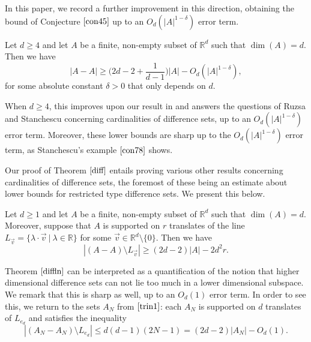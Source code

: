 In this paper, we record a further improvement in this direction, obtaining the bound of Conjecture $\ref{con45}$ up to an $O_{d}(|A|^{1- \delta})$ error term.

\begin{theorem} \label{diff}
Let $d \geq 4$ and let $A$ be a finite, non-empty subset of $\mathbb{R}^d$ such that $\dim(A) = d$. Then we have
\[ |A-A| \geq \bigg(2d - 2 + \frac{1}{d-1}\bigg) |A| - O_d(|A|^{1- \delta}), \]
for some absolute constant $\delta >0$ that only depends on $d$.
\end{theorem}

When $d \geq 4$, this improves upon our result in \cite{Ak2021} and answers the questions of Ruzsa \cite{Ru1994} and Stanchescu \cite{St2001} concerning cardinalities of difference sets, up to an $O_d(|A|^{1 - \delta})$ error term. Moreover, these lower bounds are sharp up to the $O_d(|A|^{1 - \delta})$ error term, as Stanchescu's example $\eqref{con78}$ shows. 

Our proof of Theorem $\ref{diff}$ entails proving various other results concerning cardinalities of difference sets, the foremost of these being an estimate about lower bounds for restricted type difference sets. We present this below.

%
%
%
%
%
%
%



\begin{theorem} \label{diffln}
Let $d \geq 1$ and let $A$ be a finite, non-empty subset of $\mathbb{R}^d$ such that $\dim(A) = d$. Moreover, suppose that $A$ is supported on $r$ translates of the line $L_{\vec{v}} = \{ \lambda \cdot \vec{v} \ | \ \lambda \in \mathbb{R}\}$ for some $\vec{v} \in \mathbb{R}^d \setminus \{0\}$. Then we have
\[ |(A-A)\setminus L_{\vec{v}}| \geq (2d - 2) |A| - 2d^2 r. \]
\end{theorem}

Theorem $\ref{diffln}$ can be interpreted as a quantification of the notion that higher dimensional difference sets can not lie too much in a lower dimensional subspace. We remark that this is sharp as well, up to an $O_{d}(1)$ error term. In order to see this, we return to the sets $A_N$ from $\eqref{trin1}$: each $A_N$ is supported on $d$ translates of $L_{e_d}$ and satisfies the inequality
\[ |(A_N - A_N) \setminus L_{e_d}| \leq d(d-1) (2N -1) =(2d-2) |A_N| - O_{d}(1). \]
\par

